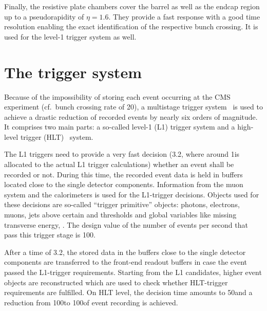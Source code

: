 Finally, the resistive plate chambers cover the barrel as well as the endcap region up to a pseudorapidity of $\eta=1.6$. 
They provide a fast response with a good time resolution enabling the exact identification of the respective bunch crossing.
It is used for the level-1 trigger system as well.
\section{The trigger system}
\label{sec:TriggerSystem}
Because of the impossibility of storing each event occurring at the CMS experiment (cf.~bunch crossing rate of 20\mhz), a multistage trigger system~\cite{bib:CMS:TDR_2006} is used to achieve a drastic reduction of recorded events by nearly six orders of magnitude.
It comprises two main parts: a so-called level-1 (L1) trigger system and a high-level trigger (HLT)~\cite{bib:CMS:HLT_Trigger} system.

The L1 triggers need to provide a very fast decision (3.2\mus, where around 1\mus is allocated to the actual L1 trigger calculations) whether an event shall be recorded or not.
During this time, the recorded event data is held in buffers located close to the single detector components.
Information from the muon system and the calorimeters is used for the L1-trigger decisions.
Objects used for these decisions are so-called ``trigger primitive'' objects: photons, electrons, muons, jets above certain \et and \pt thresholds and global variables like missing transverse energy, \met. 
The design value of the number of events per second that pass this trigger stage is 100\khz.

After a time of 3.2\mus, the stored data in the buffers close to the single detector components are transferred to the front-end readout buffers in case the event passed the L1-trigger requirements.
Starting from the L1 candidates, higher event objects are reconstructed which are used to check whether HLT-trigger requirements are fulfilled.
On HLT level, the decision time amounts to 50\ms and a reduction from 100\khz to 100\hz of event recording is achieved.

\FloatBarrier
